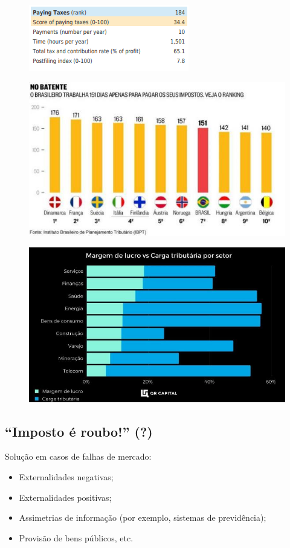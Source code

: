 \documentclass[a4paper,12pt]{article}[abntex2]
\begin{document}
\begin{figure}[H]
    \centering
    \includegraphics[width=0.5\linewidth]{Imagens/a18i4.png}
\end{figure}

\begin{figure}[H]
    \centering
    \includegraphics[width=0.5\linewidth]{Imagens/a18i5.png}
\end{figure}

\begin{figure}[H]
    \centering
    \includegraphics[width=0.7\linewidth]{Imagens/a18i6.png}
\end{figure}

\subsection{\textbf{“Imposto é roubo!” (?)}}
Solução em casos de falhas de mercado:
\begin{itemize}
  \item Externalidades negativas;
  \item Externalidades positivas;
  \item Assimetrias de informação (por exemplo, sistemas de previdência);
  \item Provisão de bens públicos, etc.
\end{itemize}
\end{document}
